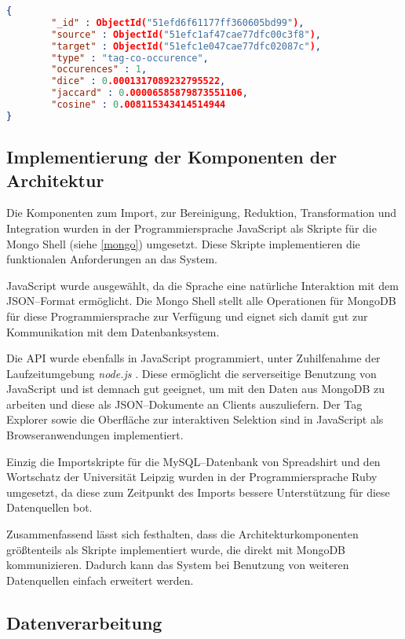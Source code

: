 \begin{lstlisting}[language=json, label={lst:edge_json}, caption={JSON--Beispiel für ein Kantendokument}, float]
{
        "_id" : ObjectId("51efd6f61177ff360605bd99"),
        "source" : ObjectId("51efc1af47cae77dfc00c3f8"),
        "target" : ObjectId("51efc1e047cae77dfc02087c"),
        "type" : "tag-co-occurence",
        "occurences" : 1,
        "dice" : 0.0001317089232795522,
        "jaccard" : 0.00006585879873551106,
        "cosine" : 0.008115343414514944
}
\end{lstlisting}

\subsection{Implementierung der Komponenten der Architektur}
\label{arch_components_impl}

Die Komponenten zum Import, zur Bereinigung, Reduktion, Transformation und Integration wurden in der Programmiersprache JavaScript als Skripte für die Mongo Shell (siehe \cref{mongo}) umgesetzt. Diese Skripte implementieren die funktionalen Anforderungen an das System.

JavaScript wurde ausgewählt, da die Sprache eine natürliche Interaktion mit dem JSON--Format ermöglicht. Die Mongo Shell stellt alle Operationen für MongoDB für diese Programmiersprache zur Verfügung und eignet sich damit gut zur Kommunikation mit dem Datenbanksystem.

Die API wurde ebenfalls in JavaScript programmiert, unter Zuhilfenahme der Laufzeitumgebung \emph{node.js} \cite{node}. Diese ermöglicht die serverseitige Benutzung von JavaScript und ist demnach gut geeignet, um mit den Daten aus MongoDB zu arbeiten und diese als JSON--Dokumente an Clients auszuliefern. Der Tag Explorer sowie die Oberfläche zur interaktiven Selektion sind in JavaScript als Browseranwendungen implementiert.

Einzig die Importskripte für die MySQL--Datenbank von Spreadshirt und den Wortschatz der Universität Leipzig wurden in der Programmiersprache Ruby umgesetzt, da diese zum Zeitpunkt des Imports bessere Unterstützung für diese Datenquellen bot.

Zusammenfassend lässt sich festhalten, dass die Architekturkomponenten größtenteils als Skripte implementiert wurde, die direkt mit MongoDB kommunizieren. Dadurch kann das System bei Benutzung von weiteren Datenquellen einfach erweitert werden.

\subsection{Datenverarbeitung}
\label{mapreduce}

